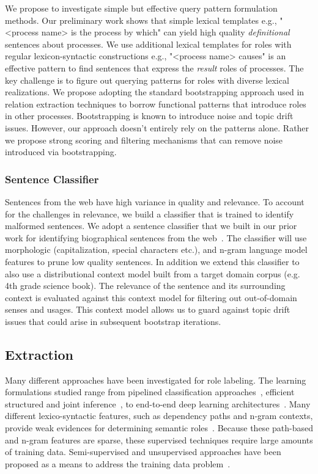 We propose to investigate simple but effective query pattern formulation methods. 
Our preliminary work shows that simple lexical templates e.g., "<process name> is the process by which" can yield high quality {\em definitional} sentences about processes. 
We use additional lexical templates for roles with regular lexicon-syntactic constructions e.g., "<process name> causes" is an effective pattern to find sentences that express the {\em result} roles of processes. The key challenge is to figure out querying patterns for roles with diverse lexical realizations. We propose adopting the standard bootstrapping approach used in relation extraction techniques to borrow functional patterns that introduce roles in other processes. Bootstrapping is known to introduce noise and topic drift issues. However, our approach doesn't entirely rely on the patterns alone. Rather we propose strong scoring and filtering mechanisms that can remove noise introduced via bootstrapping.
\subsubsection{Sentence Classifier}
Sentences from the web have high variance in quality and relevance.  
To account for the challenges in relevance, we build a classifier that is trained to identify malformed sentences. 
We adopt a sentence classifier that we built in our prior work for identifying biographical sentences from the web~\cite{balasubramanian2009automatic}.
The classifier will use morphologic (capitalization, special characters etc.), and n-gram language model features to prune low quality sentences. 
In addition we extend this classifier to also use a distributional context model built from a target domain corpus (e.g. 4th grade science book). 
The relevance of the sentence and its surrounding context is evaluated against this context model for filtering out out-of-domain senses and usages.
This context model allows us to guard against topic drift issues that could arise in subsequent bootstrap iterations.

\subsection{Extraction}

Many different approaches have been investigated for role labeling.
The learning formulations studied range from pipelined classification approaches~\cite{gildea2002automatic,bjorkelund2009multilingual}, 
efficient structured and joint inference~\cite{koomen2005generalized,tackstrom2015efficient}, to end-to-end deep learning architectures~\cite{foland2015dependency}.
Many different lexico-syntactic features, such as dependency paths and n-gram contexts, provide weak evidences for determining semantic roles~\cite{gildea2002automatic}. 
Because these path-based and n-gram features are sparse, these supervised techniques require large amounts of training data. 
Semi-supervised and unsupervised approaches have been proposed as a means to address the training data problem~\cite{furstenau-emnlp2009,klementievsemi}.

